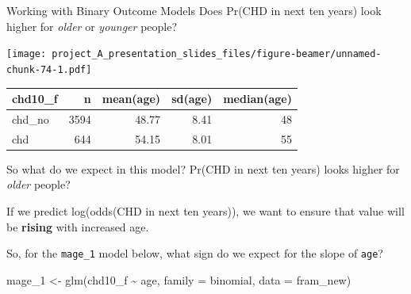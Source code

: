 \documentclass[
  ignorenonframetext,
]{beamer}
\newenvironment{Shaded}{\begin{snugshade}}{\end{snugshade}}
\newcommand{\AttributeTok}[1]{\textcolor[rgb]{0.77,0.63,0.00}{#1}}
\newcommand{\FunctionTok}[1]{\textcolor[rgb]{0.00,0.00,0.00}{#1}}
\newcommand{\NormalTok}[1]{#1}
\newcommand{\OtherTok}[1]{\textcolor[rgb]{0.56,0.35,0.01}{#1}}
\newcommand{\SpecialCharTok}[1]{\textcolor[rgb]{0.00,0.00,0.00}{#1}}
\begin{document}
\begin{frame}{Working with Binary Outcome Models}
\protect\hypertarget{working-with-binary-outcome-models}{}
Does Pr(CHD in next ten years) look higher for \emph{older} or
\emph{younger} people?

\texttt{[image: project\_A\_presentation\_slides\_files/figure-beamer/unnamed-chunk-74-1.pdf]}

\begin{longtable}[]{@{}lrrrr@{}}
\toprule
chd10\_f & n & mean(age) & sd(age) & median(age) \\
\midrule
\endhead
chd\_no & 3594 & 48.77 & 8.41 & 48 \\
chd & 644 & 54.15 & 8.01 & 55 \\
\bottomrule
\end{longtable}
\end{frame}

\begin{frame}[fragile]{So what do we expect in this model?}
\protect\hypertarget{so-what-do-we-expect-in-this-model}{}
Pr(CHD in next ten years) looks higher for \emph{older} people?

If we predict log(odds(CHD in next ten years)), we want to ensure that
value will be \textbf{rising} with increased age.

So, for the \texttt{mage\_1} model below, what sign do we expect for the
slope of \texttt{age}?

\begin{Shaded}
\begin{Highlighting}[]
\NormalTok{mage\_1 }\OtherTok{\textless{}{-}} \FunctionTok{glm}\NormalTok{(chd10\_f }\SpecialCharTok{\textasciitilde{}}\NormalTok{ age, }\AttributeTok{family =}\NormalTok{ binomial, }
              \AttributeTok{data =}\NormalTok{ fram\_new)}
\end{Highlighting}
\end{Shaded}
\end{frame}
\end{document}
